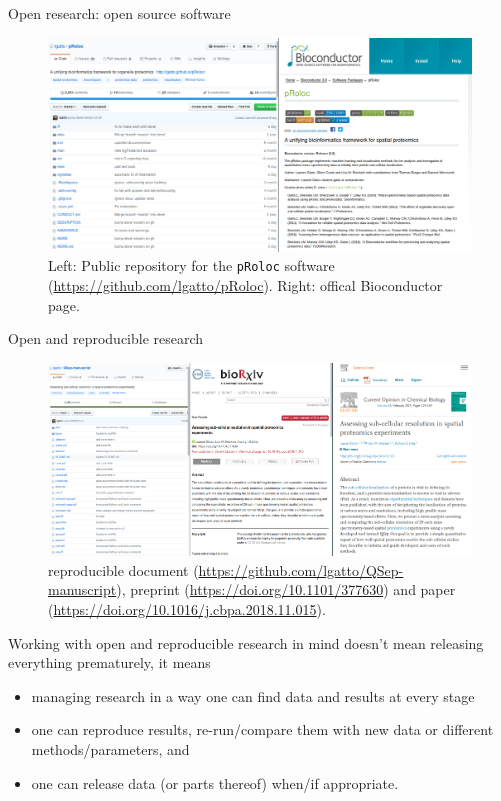 \begin{frame}{Open research: open source software}
  \centering
  \begin{figure}
  \includegraphics[width=\linewidth]{./figs/pRoloc_screen.png}
    \caption{\cite{Gatto:2014} Left: Public repository for the \texttt{pRoloc} software
      (\url{https://github.com/lgatto/pRoloc}). Right: offical
      Bioconductor page.}
  \end{figure}
\end{frame}

\begin{frame}{Open and reproducible research}
  \centering
  \begin{figure}
    \includegraphics[width=1\linewidth]{./figs/qsep_screen.png}
    \caption{\cite{Gatto:2018} reproducible document
      (\url{https://github.com/lgatto/QSep-manuscript}), preprint
      (\url{https://doi.org/10.1101/377630}) and paper
      (\url{https://doi.org/10.1016/j.cbpa.2018.11.015}).}
  \end{figure}
\end{frame}

\begin{frame}{}
Working with open and reproducible research in mind doesn't mean
releasing everything prematurely, it means

\begin{itemize}
\item managing research in a way one can find data and results at
  every stage

\item one can reproduce results, re-run/compare them with new data or
  different methods/parameters, and

\item  one can release data (or parts thereof) when/if appropriate.
\end{itemize}
\end{frame}

